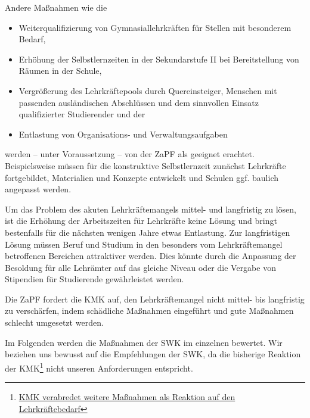 \documentclass[DIV=calc]{scrartcl}
\begin{document}
Andere Maßnahmen wie die
\begin{itemize}
    \item Weiterqualifizierung von Gymnasiallehrkräften für Stellen mit besonderem Bedarf,
    \item Erhöhung der Selbstlernzeiten in der Sekundarstufe II bei Bereitstellung von Räumen in der Schule,
    \item Vergrößerung des Lehrkräftepools durch Quereinsteiger, Menschen mit passenden ausländischen Abschlüssen und dem sinnvollen Einsatz qualifizierter Studierender und der
    \item Entlastung von Organisations- und Verwaltungsaufgaben
\end{itemize}
werden -- unter Voraussetzung -- von der ZaPF als geeignet erachtet. 
Beispielsweise müssen für die konstruktive Selbstlernzeit zunächst Lehrkräfte fortgebildet, Materialien und Konzepte entwickelt und Schulen ggf. baulich angepasst werden.

Um das Problem des akuten Lehrkräftemangels mittel- und langfristig zu lösen, ist die Erhöhung der Arbeitszeiten für Lehrkräfte keine Lösung und bringt bestenfalls für die nächsten wenigen Jahre
etwas Entlastung. 
Zur langfristigen Lösung müssen Beruf und Studium in den besonders vom Lehrkräftemangel betroffenen 
Bereichen attraktiver werden. Dies könnte durch die Anpassung der Besoldung für alle Lehrämter auf das gleiche Niveau oder die Vergabe von Stipendien für Studierende gewährleistet werden.

Die ZaPF fordert die KMK auf, den Lehrkräftemangel nicht mittel- bis langfristig zu verschärfen, indem schädliche Maßnahmen eingeführt und gute Maßnahmen schlecht umgesetzt werden.

Im Folgenden werden die Maßnahmen der SWK im einzelnen bewertet. Wir beziehen uns bewusst auf die Empfehlungen der SWK, da die bisherige Reaktion der KMK\footnote{\href{https://www.kmk.org/aktuelles/artikelansicht/kmk-verabredet-weitere-massnahmen-als-reaktion-auf-den-lehrkraeftebedarf.html}{KMK verabredet weitere Maßnahmen als Reaktion auf den Lehrkräftebedarf}} nicht unseren Anforderungen entspricht.


\end{document}
